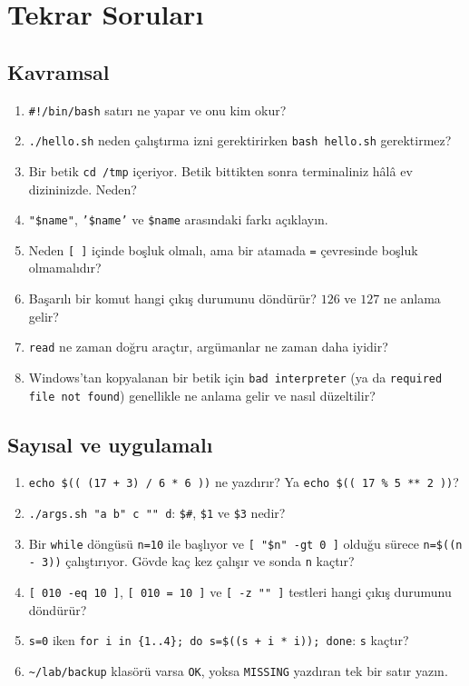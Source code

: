 \documentclass[11pt,a4paper]{article}
\begin{document}
\section{Tekrar Soruları}

\subsection*{Kavramsal}
\begin{enumerate}[leftmargin=1.6em]
  \item \texttt{\#!/bin/bash} satırı ne yapar ve onu kim okur?
  \item \texttt{./hello.sh} neden çalıştırma izni gerektirirken \texttt{bash hello.sh} gerektirmez?
  \item Bir betik \texttt{cd /tmp} içeriyor. Betik bittikten sonra terminaliniz hâlâ ev dizininizde. Neden?
  \item \texttt{"\$name"}, \texttt{'\$name'} ve \texttt{\$name} arasındaki farkı açıklayın.
  \item Neden \texttt{[ ]} içinde boşluk olmalı, ama bir atamada \texttt{=} çevresinde boşluk olmamalıdır?
  \item Başarılı bir komut hangi çıkış durumunu döndürür? $126$ ve $127$ ne anlama gelir?
  \item \texttt{read} ne zaman doğru araçtır, argümanlar ne zaman daha iyidir?
  \item Windows'tan kopyalanan bir betik için \texttt{bad interpreter} (ya da \texttt{required file not found}) genellikle ne anlama gelir ve nasıl düzeltilir?
\end{enumerate}

\subsection*{Sayısal ve uygulamalı}
\begin{enumerate}[leftmargin=1.6em,resume]
  \item \texttt{echo \$(( (17 + 3) / 6 * 6 ))} ne yazdırır? Ya \texttt{echo \$(( 17 \% 5 ** 2 ))}?
  \item \texttt{./args.sh "a b" c "" d}: \texttt{\$\#}, \texttt{\$1} ve \texttt{\$3} nedir?
  \item Bir \texttt{while} döngüsü \texttt{n=10} ile başlıyor ve \texttt{[ "\$n" -gt 0 ]} olduğu sürece \texttt{n=\$((n - 3))} çalıştırıyor. Gövde kaç kez çalışır ve sonda \texttt{n} kaçtır?
  \item \texttt{[ 010 -eq 10 ]}, \texttt{[ 010 = 10 ]} ve \texttt{[ -z "" ]} testleri hangi çıkış durumunu döndürür?
  \item \texttt{s=0} iken \texttt{for i in \{1..4\}; do s=\$((s + i * i)); done}: \texttt{s} kaçtır?
  \item \texttt{\textasciitilde/lab/backup} klasörü varsa \texttt{OK}, yoksa \texttt{MISSING} yazdıran tek bir satır yazın.
\end{enumerate}
\end{document}

